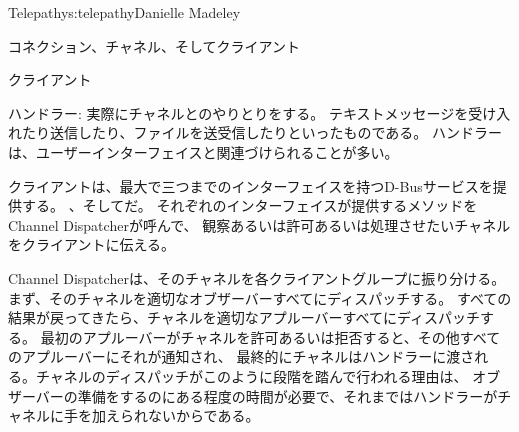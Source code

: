 \begin{aosachapter}{Telepathy}{s:telepathy}{Danielle Madeley}
\begin{aosasect1}{コネクション、チャネル、そしてクライアント}
\begin{aosasect2}{クライアント}
\begin{aosadescription}
  \item{ハンドラー}: 実際にチャネルとのやりとりをする。
  テキストメッセージを受け入れたり送信したり、ファイルを送受信したりといったものである。
  ハンドラーは、ユーザーインターフェイスと関連づけられることが多い。

\end{aosadescription}

クライアントは、最大で三つまでのインターフェイスを持つD-Busサービスを提供する。
、そしてだ。
それぞれのインターフェイスが提供するメソッドをChannel Dispatcherが呼んで、
観察あるいは許可あるいは処理させたいチャネルをクライアントに伝える。

Channel Dispatcherは、そのチャネルを各クライアントグループに振り分ける。
まず、そのチャネルを適切なオブザーバーすべてにディスパッチする。
すべての結果が戻ってきたら、チャネルを適切なアプルーバーすべてにディスパッチする。
最初のアプルーバーがチャネルを許可あるいは拒否すると、その他すべてのアプルーバーにそれが通知され、
最終的にチャネルはハンドラーに渡される。チャネルのディスパッチがこのように段階を踏んで行われる理由は、
オブザーバーの準備をするのにある程度の時間が必要で、それまではハンドラーがチャネルに手を加えられないからである。


\end{aosasect2}
\end{aosasect1}
\end{aosachapter}
